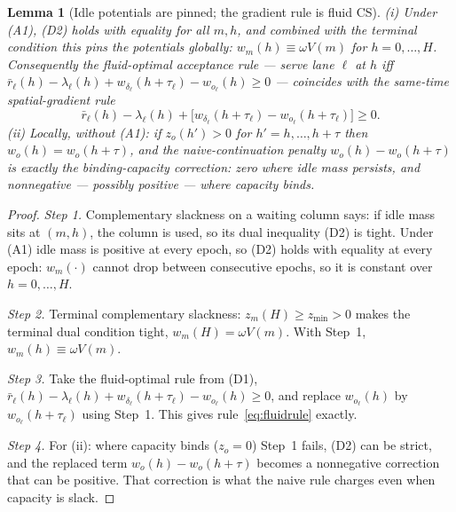 \documentclass[11pt]{article}
\newtheorem{lemma}{Lemma}
\begin{document}
\begin{lemma}[Idle potentials are pinned; the gradient rule is fluid CS]
\label{lem:flat}
(i) Under (A1), (D2) holds with equality for all $m, h$, and combined
with the terminal condition this pins the potentials globally:
$w_m(h) \equiv \omega V(m)$ for $h = 0, \dots, H$. Consequently the
fluid-optimal acceptance rule ---
serve lane $\ell$ at $h$ iff
$\bar{r}_{\ell}(h) - \lambda_{\ell}(h) + w_{\delta_{\ell}}(h + \tau_{\ell})
- w_{o_{\ell}}(h) \geq 0$ --- coincides with the same-time
spatial-gradient rule
\begin{equation}
  \bar{r}_{\ell}(h) - \lambda_{\ell}(h)
  + \bigl[ w_{\delta_{\ell}}(h + \tau_{\ell})
  - w_{o_{\ell}}(h + \tau_{\ell}) \bigr] \geq 0.
  \label{eq:fluidrule}
\end{equation}
(ii) Locally, without (A1): if $z_o(h') > 0$ for
$h' = h, \dots, h + \tau$ then
$w_o(h) = w_o(h + \tau)$, and the naive-continuation penalty
$w_o(h) - w_o(h + \tau)$ is exactly the binding-capacity correction:
zero where idle mass persists, and nonnegative --- possibly positive
--- where capacity binds.
\end{lemma}

\begin{proof}
\emph{Step 1.} Complementary slackness on a waiting column says: if
idle mass sits at $(m, h)$, the column is used, so its dual
inequality (D2) is tight. Under (A1) idle mass is positive at every
epoch, so (D2) holds with equality at every epoch: $w_m(\cdot)$
cannot drop between consecutive epochs, so it is constant over
$h = 0, \dots, H$.

\emph{Step 2.} Terminal complementary slackness: $z_m(H) \geq
z_{\min} > 0$ makes the terminal dual condition tight,
$w_m(H) = \omega V(m)$. With Step~1, $w_m(h) \equiv \omega V(m)$.

\emph{Step 3.} Take the fluid-optimal rule from (D1),
$\bar{r}_{\ell}(h) - \lambda_{\ell}(h) + w_{\delta_{\ell}}(h+\tau_{\ell})
- w_{o_{\ell}}(h) \geq 0$, and replace $w_{o_{\ell}}(h)$ by
$w_{o_{\ell}}(h + \tau_{\ell})$ using Step~1. This gives
rule~\eqref{eq:fluidrule} exactly.

\emph{Step 4.} For (ii): where capacity binds ($z_o = 0$) Step~1
fails, (D2) can be strict, and the replaced term
$w_o(h) - w_o(h+\tau)$ becomes a nonnegative correction that can be
positive. That correction
is what the naive rule charges even when capacity is slack.
\end{proof}
\end{document}
